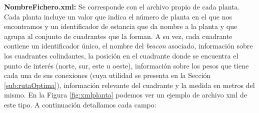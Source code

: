 \textbf{NombreFichero.xml:} Se corresponde con el archivo propio de cada planta. Cada planta incluye un valor que indica el número de planta en el que nos encontramos y un identificador de estancia que da nombre a la planta y que agrupa al conjunto de cuadrantes que la forman. A su vez, cada cuadrante contiene un identificador único, el nombre del \textit{beacon} asociado, información sobre los cuadrantes colindantes, la posición en el cuadrante donde se encuentra el punto de interés (norte, sur, este u oeste), información sobre los pesos que tiene cada una de sus conexiones (cuya utilidad se presenta en la Sección \ref{sub:rutaOptima}), información relevante del cuadrante y la medida en metros del mismo. En la Figura \ref{fig:xmlplanta} podemos ver un ejemplo de archivo xml de este tipo. A continuación detallamos cada campo:

